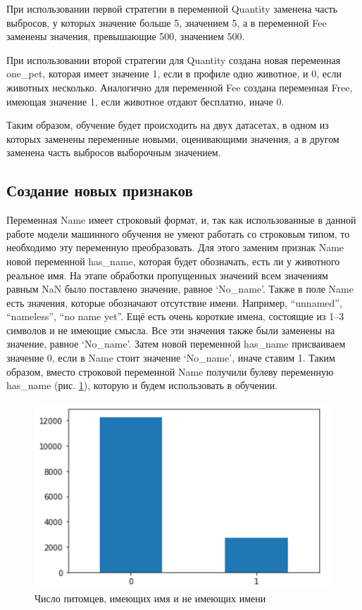 \documentclass[14pt]{mmcs_article}
\begin{document}
При использовании первой стратегии в переменной Quantity заменена часть выбросов, у которых значение больше 5, значением 5, а в переменной Fee заменены значения, превышающие 500, значением 500.

При использовании второй стратегии для Quantity создана новая переменная one\_pet, которая имеет значение 1, если в профиле одно животное, и 0, если животных несколько. Аналогично для переменной Fee создана переменная Free, имеющая значение 1, если животное отдают бесплатно, иначе 0.

Таким образом, обучение будет происходить на двух датасетах, в одном из которых заменены переменные новыми, оценивающими значения, а в другом заменена часть выбросов выборочным значением.


\subsection{Создание новых признаков}

Переменная Name имеет строковый формат, и, так как использованные в данной работе модели машинного обучения не умеют работать со строковым типом, то необходимо эту переменную преобразовать. Для этого заменим признак Name новой переменной has\_name, которая будет обозначать, есть ли у животного реальное имя. На этапе обработки пропущенных значений всем значениям равным NaN было поставлено значение, равное `No\_name'. Также в поле Name есть значения, которые обозначают отсутствие имени. Например, ``unnamed'', ``nameless'', ``no name yet''. Ещё есть очень короткие имена, состоящие из 1–3 символов и не имеющие смысла. Все эти значения также были заменены на значение, равное `No\_name'. Затем новой переменной has\_name присваиваем значение 0, если в Name стоит значение `No\_name', иначе ставим 1. Таким образом, вместо строковой переменной Name получили булеву переменную has\_name (рис. \ref{analyse:hasname}), которую и будем использовать в обучении.

\begin{figure}[H]
	\centering
	\includegraphics[scale=1]{hasname.png}
	\caption{Число питомцев, имеющих имя и не имеющих имени}\label{analyse:hasname}
\end{figure}
\end{document}
